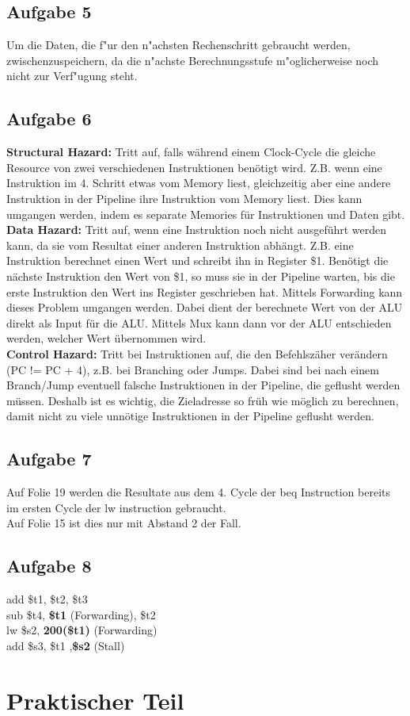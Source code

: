 \documentclass[a4paper,abstracton]{scrartcl}
\begin{document}
\subsection{Aufgabe 5}
Um die Daten, die f"ur den n"achsten Rechenschritt gebraucht werden, zwischenzuspeichern, da die 
n"achste Berechnungsstufe m"oglicherweise noch nicht zur Verf"ugung steht.
\subsection{Aufgabe 6}
\textbf{Structural Hazard:} Tritt auf, falls während einem Clock-Cycle die gleiche Resource von zwei verschiedenen Instruktionen benötigt wird. Z.B. wenn eine Instruktion im 4. Schritt etwas vom Memory liest, gleichzeitig aber eine andere Instruktion in der Pipeline ihre Instruktion vom Memory liest. Dies kann umgangen werden, indem es separate Memories für Instruktionen und Daten gibt.\\
\textbf{Data Hazard:} Tritt auf, wenn eine Instruktion noch nicht ausgeführt werden kann, da sie vom Resultat einer anderen Instruktion abhängt. Z.B. eine Instruktion berechnet einen Wert und schreibt ihn in Register \$1. Benötigt die nächste Instruktion den Wert von \$1, so muss sie in der Pipeline warten, bis die erste Instruktion den Wert ins Register geschrieben hat. Mittels Forwarding kann dieses Problem umgangen werden. Dabei dient der berechnete Wert von der ALU direkt als Input für die ALU. Mittels Mux kann dann vor der ALU entschieden werden, welcher Wert übernommen wird. \\
\textbf{Control Hazard:} Tritt bei Instruktionen auf, die den Befehlszäher verändern (PC != PC + 4), z.B. bei Branching oder Jumps. Dabei sind bei nach einem Branch/Jump eventuell falsche Instruktionen in der Pipeline, die geflusht werden müssen. Deshalb ist es wichtig, die Zieladresse so früh wie möglich zu berechnen, damit nicht zu viele unnötige Instruktionen in der Pipeline geflusht werden.\\
\subsection{Aufgabe 7}
Auf Folie 19 werden die Resultate aus dem 4. Cycle der beq Instruction bereits im ersten Cycle der lw instruction gebraucht.\\
Auf Folie 15 ist dies nur mit Abstand 2 der Fall.
\subsection{Aufgabe 8}
add \$t1, \$t2, \$t3 \\
sub \$t4, \textbf{\$t1} (Forwarding), \$t2 \\
lw \$s2, \textbf{200(\$t1)} (Forwarding) \\
add \$s3, \$t1 ,\textbf{\$s2} (Stall) \\

\newpage
\section{Praktischer Teil}

\newpage

\end{document}
